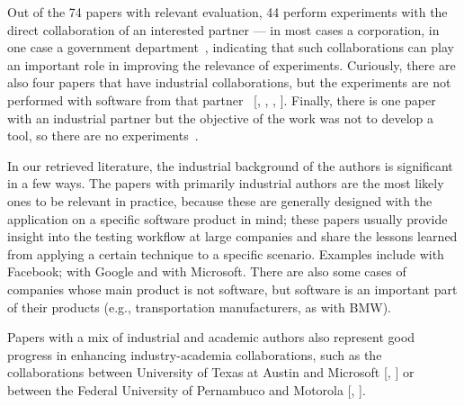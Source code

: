 Out of the 74 papers with relevant evaluation, 44 perform experiments with the direct collaboration of an interested partner --- in most cases a corporation, in one case a government department~, indicating that such collaborations can play an important role in improving the relevance of experiments.
Curiously, there are also four papers that have industrial collaborations, but the experiments are not performed with software from that partner~
[, 
, 
, 
].
Finally, there is one paper with an industrial partner but the objective of the work was not to develop a tool, so there are no experiments~.

In our retrieved literature, the industrial background of the authors is significant in a few ways.
The papers with primarily industrial authors are the most likely ones to be relevant in practice, because these are generally designed with the application on a specific software product in mind; these papers usually provide insight into the testing workflow at large companies and share the lessons learned from applying a certain technique to a specific scenario.
Examples include  with Facebook;  with Google and  with Microsoft. There are also some cases of companies whose main product is not software, but software is an important part of their products (e.g., transportation manufacturers, as  with BMW).

Papers with a mix of industrial and academic authors also represent good progress in enhancing industry-academia collaborations, such as the collaborations between University of Texas at Austin and Microsoft [, ] or between the Federal University of Pernambuco and Motorola [, ].

